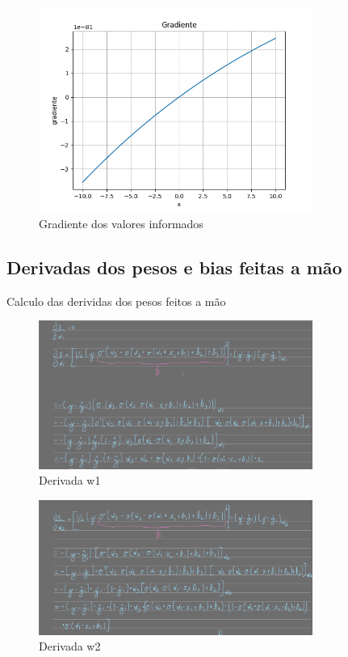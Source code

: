 \documentclass{article}
\begin{document}
\begin{figure}
  \centering
  \includegraphics[width=0.8\textwidth]{Figure_1.png}
  \caption{Gradiente dos valores informados}
  \label{fig:gradiente2}
\end{figure}

\newpage

\subsection{Derivadas dos pesos e bias feitas a mão}
\begin{flushleft}
Calculo das derividas dos pesos feitos a mão
\end{flushleft}

\begin{figure}
  \centering
  \includegraphics[width=0.8\textwidth]{Derivada_w1.png}
  \caption{Derivada w1}
  \label{fig:gradiente3}
\end{figure}

\begin{figure}
  \centering
  \includegraphics[width=0.8\textwidth]{Derivada_w2.png}
  \caption{Derivada w2}
  \label{fig:gradiente4}
\end{figure}
\end{document}
